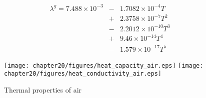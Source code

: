 \begin{eqnarray}
\lambda^g
=
7.488 \times 10^{-3}
&-&
1.7082 \times 10^{-4} T
\nonumber\\
&+&
2.3758 \times 10^{-7} T^2
\nonumber\\
&-&
2.2012 \times 10^{-10} T^3
\nonumber\\
&+&
9.46 \times 10^{-14} T^4
\nonumber\\
&-&
1.579 \times 10^{-17} T^5
\label{eqn:thermal_conductivity}
\end{eqnarray}

\begin{figure}[htb!]
\begin{center}
\texttt{[image: chapter20/figures/heat\_capacity\_air.eps]}
\texttt{[image: chapter20/figures/heat\_conductivity\_air.eps]}
\end{center}
\caption{Thermal properties of air}
\label{fig:thermal_properties}
\end{figure}